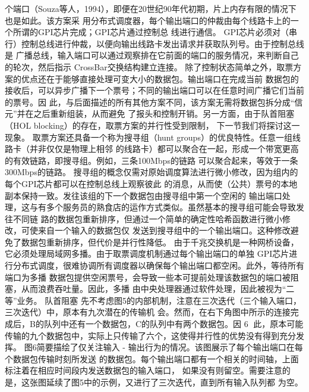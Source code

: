 个端口（Souza等人，1994），即便在20世纪90年代初期，片上内存有限的情况下也是如此。该方案采
用分布式调度器，每个输出端口的仲裁由每个线路卡上的一个所谓的GPI芯片完成；GPI芯片通过控制总
线进行通信。
GPI芯片必须对（串行）控制总线进行仲裁，以便向输出线路卡发出请求并获取队列号。由于控制总线是
广播总线，输入端口可以通过观察排在它前面的端口的服务情况，来判断自己的轮次，然后指示
CrossBar交换结构建立连接。
除了控制状态简单之外，取票方案的优点还在于能够直接处理可变大小的数据包。输出端口在完成当前
数据包的接收后，可以异步广播下一个票号；不同的输出端口可以在任意时间广播它们当前的票号。因
此，与后面描述的所有其他方案不同，该方案无需将数据包拆分成“信元”并在之后重新组装，从而避免
了报头和控制开销。另一方面，由于队首阻塞（HOL blocking）的存在，取票方案的并行性受到限制，
下一节我们将探讨这一现象。
取票方案还具备一个称为搜寻组（hunt groups）的优良特性。任意一组线路卡（并非仅仅是物理上相邻
的线路卡）都可以聚合在一起，形成一个带宽更高的有效链路，即搜寻组。例如，三条100Mbps的链路
可以聚合起来，等效于一条300Mbps的链路。
搜寻组的概念仅需对原始调度算法进行微小修改，因为组内的每个GPI芯片都可以在控制总线上观察彼此
的消息，从而使（公共）票号的本地副本保持一致。发往该组的下一个数据包由搜寻组中第一个空闲的
输出端口处理，这与有多个服务员的熟食店的运作方式类似。虽然基本的搜寻组可能会导致发往不同链
路的数据包重新排序，但通过一个简单的确定性哈希函数进行微小修改，可使来自一个输入的数据包仅
发送到搜寻组中的一个输出端口。这种修改避免了数据包重新排序，但代价是并行性降低。
由于千兆交换机是一种网桥设备，它必须处理局域网多播。由于取票调度机制通过每个输出端口的单独
GPI芯片进行分布式调度，很难协调所有调度器以确保每个输出端口都空闲。此外，等待所有端口为多播
数据包提供空闲票号，会导致一些本可提前处理该数据包的端口被阻塞，从而浪费吞吐量。因此，多播
由中央处理器通过软件处理，因此被视为“二等”业务。
队首阻塞
先不考虑图5的内部机制，注意在三次迭代（三个输入端口，三次迭代）中，原本有九次潜在的传输机
会。然而，在右下角图中所示的连接完成后，B的队列中还有一个数据包，C的队列中有两个数据包。因
                                                   6
此，原本可能传输的九个数据包中，实际上只传输了六个，这使得并行性的优势没有得到充分发挥。
图6简要描绘了仅关注输入 - 输出行为的情况。该图展示了每个输出端口在每个数据包传输时刻所发送
的数据包。每个输出端口都有一个相关的时间轴，上面标注着在相应时间段内发送数据包的输入端口，
如果没有则留空。需要注意的是，这张图延续了图5中的示例，又进行了三次迭代，直到所有输入队列都
为空。




